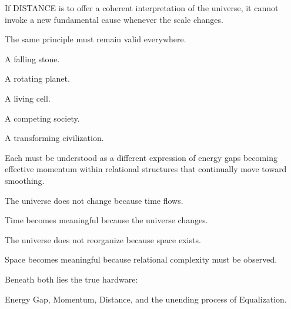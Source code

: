 If DISTANCE is to offer a coherent interpretation of the universe, it cannot invoke a new fundamental cause whenever the scale changes.

The same principle must remain valid everywhere.

A falling stone.

A rotating planet.

A living cell.

A competing society.

A transforming civilization.

Each must be understood as a different expression of energy gaps becoming effective momentum within relational structures that continually move toward smoothing.

The universe does not change because time flows.

Time becomes meaningful because the universe changes.

The universe does not reorganize because space exists.

Space becomes meaningful because relational complexity must be observed.

Beneath both lies the true hardware:

Energy Gap, Momentum, Distance, and the unending process of Equalization.